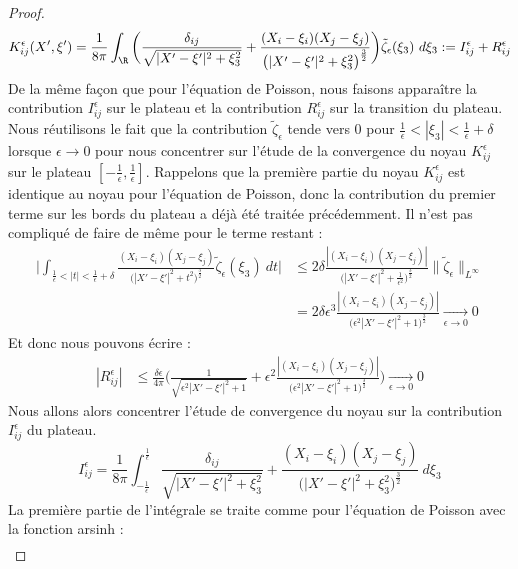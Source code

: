\begin{proof}
$$K_{ij}^{\epsilon}(X',\xi') = \frac{1}{8\pi} \int_{\R}  \bigg( \frac{\delta_{ij}}{\sqrt{|X' - \xi'|^2 + \xi_3^2}} + \frac{(X_i - \xi_i)(X_j - \xi_j)}{\big(|X' - \xi'|^2 + \xi_3^2\big)^{\frac{3}{2}}} \bigg) \tilde{\zeta}_{\epsilon}(\xi_3) \ d\xi_3 := I_{ij}^{\epsilon} + R_{ij}^{\epsilon} $$
De la même façon que pour l'équation de Poisson, nous faisons apparaître la contribution $I_{ij}^{\epsilon}$ sur le plateau et la contribution $R_{ij}^{\epsilon}$ sur la transition du plateau.
Nous réutilisons le fait que la contribution $\tilde{\zeta}_{\epsilon}$ tende vers 0 pour $\frac{1}{\epsilon} < |\xi_3| < \frac{1}{\epsilon} + \delta$ lorsque $\epsilon \to 0$ pour nous concentrer sur l'étude de la convergence du noyau $K_{ij}^{\epsilon}$ sur le plateau $[-\frac{1}{\epsilon},\frac{1}{\epsilon}]$. 
Rappelons que la première partie du noyau $K_{ij}^{\epsilon}$ est identique au noyau pour l'équation de Poisson, donc la contribution du premier terme sur les bords du plateau a déjà été traitée précédemment. Il n'est pas compliqué de faire de même pour le terme restant :
\begin{align*}
    \bigg| \int_{\frac{1}{\epsilon} < |t| < \frac{1}{\epsilon} + \delta} \frac{(X_i - \xi_i)(X_j - \xi_j)}{\big(|X' - \xi'|^2 + t^2\big)^{\frac{3}{2}}} \tilde{\zeta}_{\epsilon}(\xi_3) \ dt \bigg| &\leq 2\delta \frac{|(X_i - \xi_i)(X_j - \xi_j)|}{\Big(|X' - \xi'|^2 + \frac{1}{\epsilon^2}\Big)^{\frac{3}{2}}} \|\tilde{\zeta}_{\epsilon}\|_{L^{\infty}} \\
    &= 2\delta \epsilon^3 \frac{|(X_i - \xi_i)(X_j - \xi_j)|}{\big(\epsilon^2 |X' - \xi'|^2 + 1\big)^{\frac{3}{2}}} \xrightarrow[\epsilon \to 0]{} 0
\end{align*}
Et donc nous pouvons écrire :
\begin{align*}
    |R_{ij}^{\epsilon}| &\leq \frac{\delta \epsilon}{4\pi} \bigg( \frac{1}{\sqrt{\epsilon^2 |X' - \xi'|^2 + 1}} + \epsilon^2 \frac{|(X_i - \xi_i)(X_j - \xi_j)|}{\big(\epsilon^2 |X' - \xi'|^2 + 1\big)^{\frac{3}{2}}} \bigg) \xrightarrow[\epsilon \to 0]{} 0
\end{align*}
Nous allons alors concentrer l'étude de convergence du noyau sur la contribution $I_{ij}^{\epsilon}$ du plateau.
$$ I_{ij}^{\epsilon} = \frac{1}{8\pi} \int_{-\frac{1}{\epsilon}}^{\frac{1}{\epsilon}} \frac{\delta_{ij}}{\sqrt{|X' - \xi'|^2 + \xi_3^2}} + \frac{(X_i - \xi_i)(X_j - \xi_j)}{\big(|X' - \xi'|^2 + \xi_3^2\big)^{\frac{3}{2}}} \ d\xi_3 $$
La première partie de l'intégrale se traite comme pour l'équation de Poisson avec la fonction arsinh :
\begin{align*}

\end{align*}
\end{proof}
